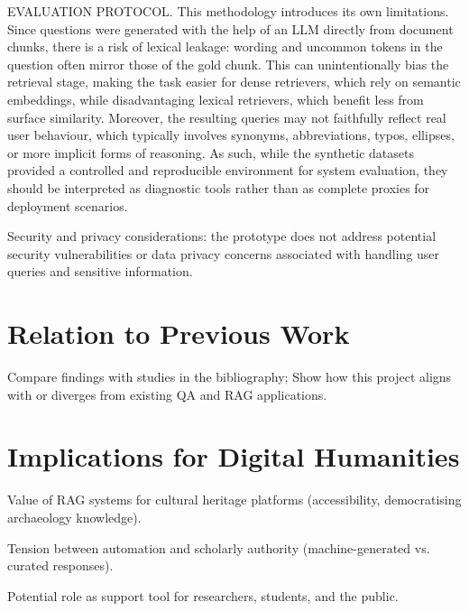 \begin{spacing}{1.5}
EVALUATION PROTOCOL.
This methodology introduces its own limitations. Since questions were generated with the help of an LLM directly from document chunks, there is a risk of lexical leakage: wording and uncommon tokens in the question often mirror those of the gold chunk. This can unintentionally bias the retrieval stage, making the task easier for dense retrievers, which rely on semantic embeddings, while disadvantaging lexical retrievers, which benefit less from surface similarity. Moreover, the resulting queries may not faithfully reflect real user behaviour, which typically involves synonyms, abbreviations, typos, ellipses, or more implicit forms of reasoning. As such, while the synthetic datasets provided a controlled and reproducible environment for system evaluation, they should be interpreted as diagnostic tools rather than as complete proxies for deployment scenarios.

Security and privacy considerations: the prototype does not address potential security vulnerabilities or data privacy concerns associated with handling user queries and sensitive information.

\section{Relation to Previous Work}
Compare findings with studies in the bibliography; Show how this project aligns with or diverges from existing QA and RAG applications.

\section{Implications for Digital Humanities}
Value of RAG systems for cultural heritage platforms (accessibility, democratising archaeology knowledge).

Tension between automation and scholarly authority (machine-generated vs. curated responses).

Potential role as support tool for researchers, students, and the public.

\end{spacing}